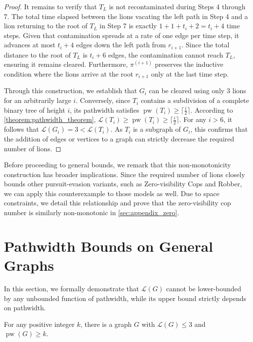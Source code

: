 \documentclass[a4paper,UKenglish,cleveref, autoref, thm-restate]{lipics-v2021}
\begin{document}
\begin{proof}
It remains to verify that $T_L$ is not recontaminated during Steps 4 through 7. The total time elapsed between the lions vacating the left path in Step 4 and a lion returning to the root of $T_L$ in Step 7 is exactly $1 + 1 + t_i + 2 = t_i + 4$ time steps. Given that contamination spreads at a rate of one edge per time step, it advances at most $t_i+4$ edges down the left path from $r_{i+1}$. Since the total distance to the root of $T_L$ is $t_i+6$ edges, the contamination cannot reach $T_L$, ensuring it remains cleared. Furthermore, $\pi^{(i+1)}$ preserves the inductive condition where the lions arrive at the root $r_{i+1}$ only at the last time step.

Through this construction, we establish that $G_i$ can be cleared using only $3$ lions for an arbitrarily large $i$. Conversely, since $T_i$ contains a subdivision of a complete binary tree of height $i$, its pathwidth satisfies $\operatorname{pw}(T_i) \geq \lceil \frac{i}{2} \rceil$. According to \cref{theorem:pathwidth_theorem}, $\mathcal{L}(T_i) \geq \operatorname{pw}(T_i) \geq \lceil \frac{i}{2} \rceil$. For any $i > 6$, it follows that $\mathcal{L}(G_i) = 3 < \mathcal{L}(T_i)$. As $T_i$ is a subgraph of $G_i$, this confirms that the addition of edges or vertices to a graph can strictly decrease the required number of lions.
\end{proof}

Before proceeding to general bounds, we remark that this non-monotonicity construction has broader implications. Since the required number of lions closely bounds other pursuit-evasion variants, such as Zero-visibility Cops and Robber, we can apply this counterexample to those models as well. Due to space constraints, we detail this relationship and prove that the zero-visibility cop number is similarly non-monotonic in \cref{sec:appendix_zero}.


\section{Pathwidth Bounds on General Graphs}\label{sec:general_graph}

In this section, we formally demonstrate that $\mathcal{L}(G)$ cannot be lower-bounded by any unbounded function of pathwidth, while its upper bound strictly depends on pathwidth.

\begin{theorem}\label{theorem:pathwidth_does_not_lower_bound_lion_number_in_general_graphs}
For any positive integer $k$, there is a graph $G$ with $\mathcal{L}(G) \leq 3$ and $\operatorname{pw}(G) \geq k$.
\end{theorem}
\end{document}
